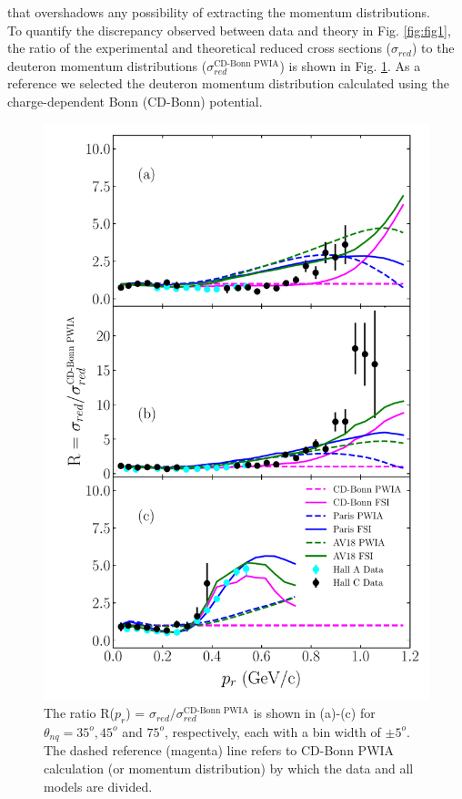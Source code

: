 that overshadows any possibility of extracting the momentum distributions. \\
\indent To quantify the discrepancy observed between data and theory in Fig. \ref{fig:fig1}, the ratio of the experimental and theoretical reduced cross sections ($\sigma_{red}$) to the deuteron momentum distributions ($\sigma^{\text{CD-Bonn PWIA}}_{red}$) is shown in Fig. \ref{fig:fig2}.
As a reference we selected the deuteron momentum distribution calculated using the charge-dependent Bonn (CD-Bonn) potential\cite{PhysRevC.63.024001}.
\begin{figure}[h!]
\includegraphics[scale=0.5]{../prl_plots/PRL_plot2.pdf}
\caption{The ratio R($p_{r}$) = $\sigma_{red}/\sigma^{{\text{CD-Bonn PWIA}}}_{red}$ is shown in (a)-(c) for $\theta_{nq}=35^{o}, 45^{o}$ and $75^{o}$, respectively, each with a bin width of $\pm 5^{o}$.
The dashed reference (magenta) line refers to CD-Bonn PWIA calculation (or momentum distribution) by which the data and all models are divided.}
\label{fig:fig2}
\end{figure} \\
